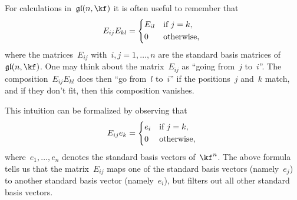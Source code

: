 \begin{recall}
  For calculations in~$\gllie(n, \kf)$ it is often useful to remember that
  \[
    E_{ij} E_{kl}
    =
    \begin{cases*}
      E_{il}  & if~$j = k$, \\
      0       & otherwise,
    \end{cases*}
  \]
  where the matrices~$E_{ij}$ with~$i,j = 1, \dotsc, n$ are the standard basis matrices of~$\gllie(n, \kf)$.
  One may think about the matrix~$E_{ij}$ as \enquote{going from~$j$ to~$i$}.
  The composition~$E_{ij} E_{kl}$ does then \enquote{go from~$l$ to~$i$} if the positions~$j$ and~$k$ match, and if they don’t fit, then this composition vanishes.
  
  This intuition can be formalized by observing that
  \[
    E_{ij} e_k
    =
    \begin{cases*}
      e_i & if~$j = k$, \\
      0   & otherwise,
    \end{cases*}
  \]
  where~$e_1, \dotsc, e_n$ denotes the standard basis vectors of~$\kf^n$.
  The above formula tells us that the matrix~$E_{ij}$ maps one of the standard basis vectors (namely~$e_j$) to another standard basis vector (namely~$e_i$), but filters out all other standard basis vectors.
\end{recall}


